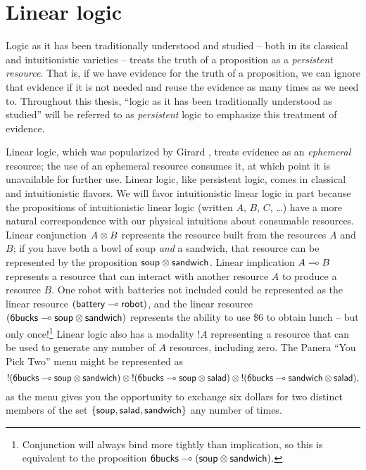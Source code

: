 
\chapter{Linear logic}

Logic as it has been traditionally understood and studied -- both in
its classical and intuitionistic varieties -- treats the truth of a
proposition as a {\it persistent resource}. That is, if we have
evidence for the truth of a proposition, we can ignore that evidence
if it is not needed and reuse the evidence as many times as we need
to. Throughout this thesis, ``logic as it has been traditionally
understood as studied'' will be referred to as {\it persistent} logic
to emphasize this treatment of evidence. 

Linear logic, which was popularized by Girard \cite{girard87linear},
treats evidence as an {\it ephemeral} resource; the use of an
ephemeral resource consumes it, at which point it is unavailable for
further use.  Linear logic, like persistent logic, comes in classical
and intuitionistic flavors. We will favor intuitionistic linear logic
in part because the propositions of intuitionistic linear logic
(written $A$, $B$, $C$, \ldots) have a more natural correspondence
with our physical intuitions about consumable resources. Linear
conjunction $A \otimes B$ represents the resource built from the
resources $A$ and $B$; if you have both a bowl of soup {\it and} a
sandwich, that resource can be represented by the proposition ${\sf
  soup} \otimes {\sf sandwich}$. Linear implication $A \multimap B$
represents a resource that can interact with another resource $A$ to
produce a resource $B$. One robot with batteries not included could be
represented as the linear resource $({\sf battery} \multimap {\sf
  robot})$, and the linear resource $({\sf 6bucks} \multimap {\sf soup}
\otimes {\sf sandwich})$ represents the ability to use \$6 to obtain
lunch -- but only once!\footnote{Conjunction will always bind more
  tightly than implication, so this is equivalent to the proposition
  ${\sf 6bucks} \multimap ({\sf soup} \otimes {\sf sandwich})$.} Linear
logic also has a modality ${!}A$ representing a resource that can be
used to generate any number of $A$ resources, including zero. The
Panera ``You Pick Two'' menu might be represented as
\[ {!}({\sf 6bucks} \multimap {\sf soup} \otimes {\sf sandwich}) \otimes
{!}({\sf 6bucks} \multimap {\sf soup} \otimes {\sf salad}) \otimes
{!}({\sf 6bucks} \multimap {\sf sandwich} \otimes {\sf salad}),\] as the
menu gives you the opportunity to exchange six dollars for two
distinct members of the set $\{ {\sf soup}, {\sf salad}, {\sf
  sandwich} \}$ any number of times.

